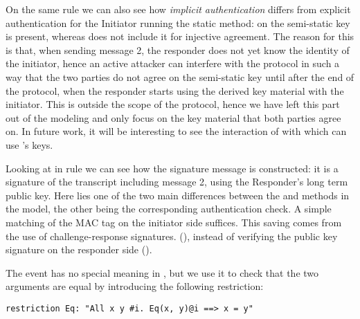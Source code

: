 On the same rule we can also see how \emph{implicit authentication}
differs from explicit authentication for the Initiator running the
static method: on  the semi-static key
\mGiy{} is present, whereas  does not include it
for injective agreement.
%
The reason for this is that, when sending message 2, the responder
does not yet know the identity of the initiator, hence an active
attacker can interfere with the protocol in such a way that the two
parties do not agree on the semi-static key
\mGiy{} until after the end of the protocol, when the responder
starts using the derived key material with the initiator.
%
This is outside the scope of the \mEdhoc{} protocol, hence we have left
this part out of the modeling and only focus on the key material that
both parties agree on.
%
In future work, it will be interesting to see the interaction of
\mEdhoc{} with \mOscore{} which can use \mEdhoc{}'s keys.

Looking at  in rule  we can
see how the signature message is constructed: it is a signature of the
transcript including message 2, using the Responder's long term public
key.
%
Here lies one of the two main differences between the \mStat{} and \mSig{} methods
in the model, the other being the corresponding authentication check.
A simple matching of the MAC tag on the initiator side suffices.
%
This saving comes from the use of challenge-response signatures.
%
(), instead of verifying the public key
signature on the responder side
%
().

The event  has no special meaning in \mTamarin{}, but we use it to check
that the two arguments are equal by introducing the following restriction:
\begin{lstlisting}
restriction Eq: "All x y #i. Eq(x, y)@i ==> x = y"
\end{lstlisting}


